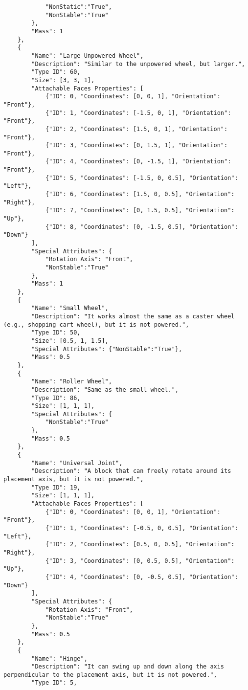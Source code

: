\begin{lstlisting}
            "NonStatic":"True",
            "NonStable":"True"
        },
        "Mass": 1
    },
    {
        "Name": "Large Unpowered Wheel",
        "Description": "Similar to the unpowered wheel, but larger.",
        "Type ID": 60,
        "Size": [3, 3, 1],
        "Attachable Faces Properties": [
            {"ID": 0, "Coordinates": [0, 0, 1], "Orientation": "Front"},
            {"ID": 1, "Coordinates": [-1.5, 0, 1], "Orientation": "Front"},
            {"ID": 2, "Coordinates": [1.5, 0, 1], "Orientation": "Front"},
            {"ID": 3, "Coordinates": [0, 1.5, 1], "Orientation": "Front"},
            {"ID": 4, "Coordinates": [0, -1.5, 1], "Orientation": "Front"},
            {"ID": 5, "Coordinates": [-1.5, 0, 0.5], "Orientation": "Left"},
            {"ID": 6, "Coordinates": [1.5, 0, 0.5], "Orientation": "Right"},
            {"ID": 7, "Coordinates": [0, 1.5, 0.5], "Orientation": "Up"},
            {"ID": 8, "Coordinates": [0, -1.5, 0.5], "Orientation": "Down"}
        ],
        "Special Attributes": {
            "Rotation Axis": "Front",
            "NonStable":"True"
        },
        "Mass": 1
    },
    {
        "Name": "Small Wheel",
        "Description": "It works almost the same as a caster wheel (e.g., shopping cart wheel), but it is not powered.",
        "Type ID": 50,
        "Size": [0.5, 1, 1.5],
        "Special Attributes": {"NonStable":"True"},
        "Mass": 0.5
    },
    {
        "Name": "Roller Wheel",
        "Description": "Same as the small wheel.",
        "Type ID": 86,
        "Size": [1, 1, 1],
        "Special Attributes": {
            "NonStable":"True"
        },
        "Mass": 0.5
    },
    {
        "Name": "Universal Joint",
        "Description": "A block that can freely rotate around its placement axis, but it is not powered.",
        "Type ID": 19,
        "Size": [1, 1, 1],
        "Attachable Faces Properties": [
            {"ID": 0, "Coordinates": [0, 0, 1], "Orientation": "Front"},
            {"ID": 1, "Coordinates": [-0.5, 0, 0.5], "Orientation": "Left"},
            {"ID": 2, "Coordinates": [0.5, 0, 0.5], "Orientation": "Right"},
            {"ID": 3, "Coordinates": [0, 0.5, 0.5], "Orientation": "Up"},
            {"ID": 4, "Coordinates": [0, -0.5, 0.5], "Orientation": "Down"}
        ],
        "Special Attributes": {
            "Rotation Axis": "Front",
            "NonStable":"True"
        },
        "Mass": 0.5
    },
    {
        "Name": "Hinge",
        "Description": "It can swing up and down along the axis perpendicular to the placement axis, but it is not powered.",
        "Type ID": 5,

\end{lstlisting}
